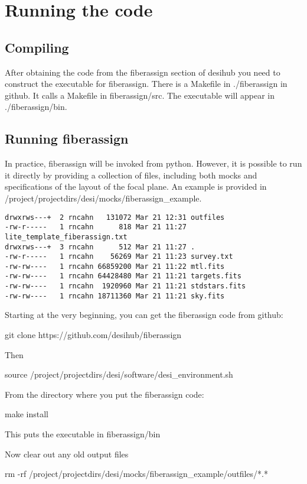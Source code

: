 \documentclass[12pt]{article}
\begin{document}
\section{Running the code}

\subsection{Compiling}
After obtaining the code from the fiberassign section of desihub you need to construct the executable for fiberassign. There is a Makefile in ./fiberassign in github.  It calls a Makefile in fiberassign/src.  The executable will appear in ./fiberassign/bin.

\subsection{Running fiberassign}
In practice, fiberassign will be invoked from python.  However, it is possible to run it directly by providing a collection of files, including both mocks and specifications of the layout of the focal plane.  An example is provided in 
/project/projectdirs/desi/mocks/fiberassign\_example.  

\begin{verbatim}
drwxrws---+  2 rncahn   131072 Mar 21 12:31 outfiles
-rw-r-----   1 rncahn      818 Mar 21 11:27 lite_template_fiberassign.txt
drwxrws---+  3 rncahn      512 Mar 21 11:27 .
-rw-r-----   1 rncahn    56269 Mar 21 11:23 survey.txt
-rw-rw----   1 rncahn 66859200 Mar 21 11:22 mtl.fits
-rw-rw----   1 rncahn 64428480 Mar 21 11:21 targets.fits
-rw-rw----   1 rncahn  1920960 Mar 21 11:21 stdstars.fits
-rw-rw----   1 rncahn 18711360 Mar 21 11:21 sky.fits
\end{verbatim}

Starting at the very beginning, you can get the fiberassign code from github:

git clone https://github.com/desihub/fiberassign

Then 

source  /project/projectdirs/desi/software/desi\_environment.sh

From the directory where you put the fiberassign code:

make install

This puts the executable in fiberassign/bin

Now clear out any old output files

rm -rf /project/projectdirs/desi/mocks/fiberassign\_example/outfiles/*.*
\end{document}
